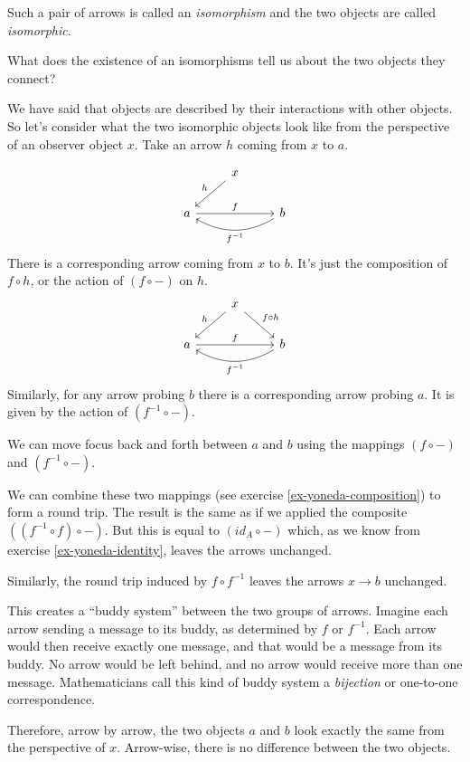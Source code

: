 \documentclass[DaoFP]{subfiles}
\begin{document}
Such a pair of arrows is called an \emph{isomorphism} and the two objects are called \emph{isomorphic}.

What does the existence of an isomorphisms tell us about the two objects they connect? 

We have said that objects are described by their interactions with other objects. So let's consider what the two isomorphic objects look like from the perspective of an observer object $x$. Take an arrow $h$ coming from $x$ to $a$.

\[
 \begin{tikzcd}
 & x
 \arrow[ld, "h"']
 \\
 a
 \arrow[rr, "f"]
  && b
 \arrow[ll, bend left,  "f^{-1}"]
 \end{tikzcd}
\]
There is a corresponding arrow coming from $x$ to $b$. It's just the composition of $f \circ h$, or the action of $(f \circ -)$ on $h$.
\[
 \begin{tikzcd}
 & x
 \arrow[ld, "h"']
 \arrow[rd, "f \circ h"]
 \\
 a
 \arrow[rr, "f"]
  && b
 \arrow[ll, bend left,  "f^{-1}"]
 \end{tikzcd}
\]
Similarly, for any arrow probing $b$ there is a corresponding arrow probing $a$. It is given by the action of  $(f^{-1} \circ -)$. 

We can move focus back and forth between $a$ and $b$ using the mappings $(f \circ -)$ and $(f^{-1} \circ -)$.

We can combine these two mappings (see exercise \ref{ex-yoneda-composition}) to form a round trip. The result is the same as if we applied the composite $((f^{-1} \circ f) \circ -)$. But this is equal to $(id_A \circ  -)$ which, as we know from exercise \ref{ex-yoneda-identity}, leaves the arrows unchanged.

Similarly, the round trip induced by $f \circ f^{-1}$ leaves the arrows $x \to b$ unchanged. 

This creates a ``buddy system'' between the two groups of arrows. Imagine each arrow sending a message to its buddy, as determined by $f$ or $f^{-1}$. Each arrow would then receive exactly one message, and that would be a message from its buddy. No arrow would be left behind, and no arrow would receive more than one message. Mathematicians call this kind of buddy system a \emph{bijection} or one-to-one correspondence.

Therefore, arrow by arrow, the two objects $a$ and $b$ look exactly the same from the perspective of $x$. Arrow-wise, there is no difference between the two objects. 
\end{document}
